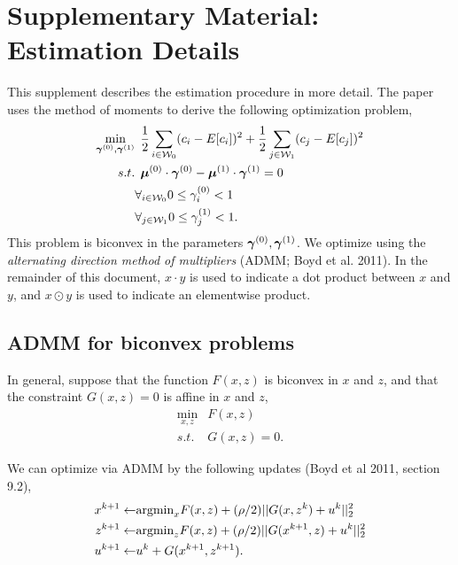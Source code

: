 \setlength\parskip{6pt}

\section{Supplementary Material: Estimation Details}

%

This supplement describes the estimation procedure in more detail. The paper uses the method of moments to derive the following optimization problem,
\begin{align}
\notag
\min_{\bm{\gamma}^{(0)}, \bm{\gamma}^{(1)}} & \:\: \frac{1}{2} \sum_{i\in \mathcal{W}_0}(c_i - E[c_i])^2 + \frac{1}{2}\sum_{j \in \mathcal{W}_1}(c_j - E[c_j])^2\\
\notag
s.t. &  \:\:  \bm{\mu}^{(0)} \cdot \bm{\gamma}^{(0)} - \bm{\mu}^{(1)} \cdot \bm{\gamma}^{(1)}=0\\
\notag
& \forall_{i\in {\ensuremath{\mathcal{W}}}_0} 0 \leq \gamma^{(0)}_i < 1\\
& \forall_{j\in {\ensuremath{\mathcal{W}}}_1} 0 \leq \gamma^{(1)}_j < 1.
\label{eq:supp-optimization}
\end{align}
This problem is biconvex in the parameters $\bm{\gamma}^{(0)},\bm{\gamma}^{(1)}$. We optimize using the \emph{alternating direction method of multipliers} (ADMM; Boyd et al. 2011)\nocite{boyd2011distributed}. In the remainder of this document, $x \cdot y$ is used to indicate a dot product between $x$ and $y$, and $x \odot y$ is used to indicate an elementwise product.

\subsection{ADMM for biconvex problems}
In general, suppose that the function $F(x,z)$ is biconvex in $x$ and $z$, and that the constraint $G(x,z) = 0$ is affine in $x$ and $z$,
\begin{align}
\min_{x,z} & F(x,z) \\
s.t.& G(x,z) = 0.
\end{align}

We can optimize via ADMM by the following updates (Boyd et al 2011, section 9.2),
\begin{align}
x^{k+1} \gets & \text{argmin}_{x} F(x,z) + (\rho/2)||G(x,z^k) + u^k||_2^2\\
z^{k+1} \gets & \text{argmin}_{z} F(x,z) + (\rho/2)||G(x^{k+1},z) + u^k||_2^2\\
u^{k+1} \gets & u^k + G(x^{k+1},z^{k+1}).
\end{align}

